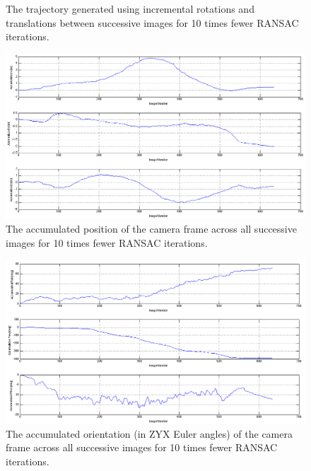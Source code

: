 \documentclass[12pt]{article} %
\begin{document}
\begin{enumerate}[label=\alph*)]
\begin{itemize}
\begin{figure}[h!]
	\caption{The trajectory generated using incremental rotations and translations between successive images for 10 times fewer RANSAC iterations.}
	\label{traj_iter}
\end{figure}

\begin{figure}[h!]
	\centering
	\includegraphics[width=450px]{position_adjusted_iter.png}
	\caption{The accumulated position of the camera frame across all successive images for 10 times fewer RANSAC iterations.}
	\label{pos_iter}
\end{figure}

\begin{figure}[h!]
	\centering
	\includegraphics[width=450px]{orientation_iter.png}
	\caption{The accumulated orientation (in ZYX Euler angles) of the camera frame across all successive images for 10 times fewer RANSAC iterations.}
	\label{orient_iter}
\end{figure}


\end{itemize}
\end{enumerate}
\end{document}
